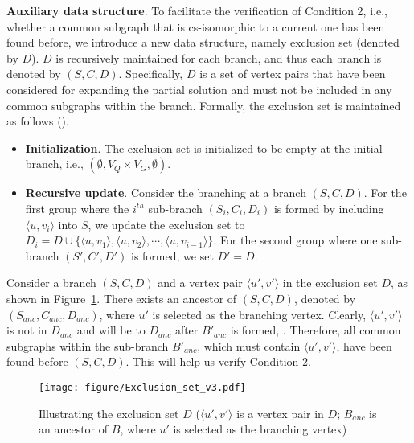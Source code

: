 \smallskip
\noindent\textbf{Auxiliary data structure}. 
{\chengC To facilitate the verification of Condition 2, i.e., whether a common subgraph that is cs-isomorphic to a current one has been found before}, we introduce a new data structure, namely exclusion set (denoted by $D$).
{\chengC $D$} is recursively maintained for each branch, and thus each branch is denoted by $(S,C,D)$. Specifically, $D$ is a set of vertex pairs that have been considered for expanding the partial solution and must not be included in any common subgraphs within the branch. Formally, the exclusion set is maintained as follows (). 
\begin{itemize}[leftmargin=*]
    \item \textbf{Initialization}. The exclusion set is initialized to {\kaixin be} empty at the initial branch, i.e., $(\emptyset, V_Q\times V_G, \emptyset)$.
    \item \textbf{Recursive update}. Consider {\chengC the} branching at a branch $(S,C,D)$. For the first group where the $i^{th}$ sub-branch $(S_i,C_i,D_i)$ is formed by including $\langle u,v_i \rangle$ into $S$, we update the exclusion set to $D_i=D\cup \{\langle u,v_1 \rangle,\langle u,v_2 \rangle,\cdots ,\langle u,v_{i-1} \rangle\}$. For the second group where one sub-branch $(S',C',D')$ is formed, we set $D'=D$.
\end{itemize}
Consider a branch $(S,C,D)$ and a vertex pair $\langle u',v' \rangle$ in the exclusion set $D$, as shown in Figure~\ref{fig:exclusion_set}. There exists an {\YuiR ancestor} of $(S,C,D)$, denoted by $(S_{anc},C_{anc},D_{anc})$, where $u'$ is selected as the branching vertex. Clearly, $\langle u',v' \rangle$ is not in $D_{anc}$ and will be  to $D_{anc}$ after $B'_{anc}$ {\chengC is formed}, . Therefore, all common subgraphs within the sub-branch $B'_{anc}$, which must contain $\langle u',v' \rangle$, have been found before $(S,C,D)$. This will help us  verify Condition 2.
\begin{figure}[]
		\texttt{[image: figure/Exclusion\_set\_v3.pdf]}
  \vspace{-0.15in}
	\caption{Illustrating the exclusion set $D$ {\YuiR ($\langle u',v'\rangle$ is a vertex pair in $D$; $B_{anc}$ is an ancestor of $B$, where $u'$ is selected as the branching vertex)}}
 \vspace{-0.2in}
	\label{fig:exclusion_set}
\end{figure}


